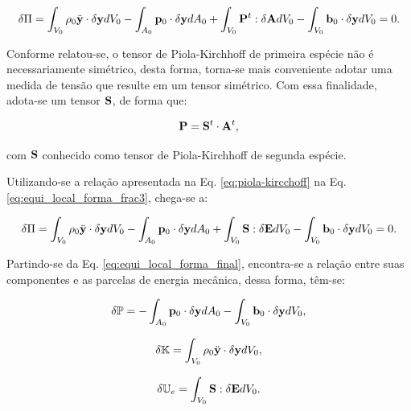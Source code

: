 \documentclass[tese_patricia]{subfiles}
\begin{document}
\begin{align}
\delta\Pi = \int_{V_{0}} \rho_{0} \ddot{\mathbf{y}} \cdot \delta\mathbf{y} dV_{0} - \int_{A_{0}} \mathbf{p}_{0} \cdot \delta\mathbf{y} dA_{0} + \int_{V_{0}} \mathbf{P}^{t} : \delta\mathbf{A} dV_{0} - \int_{V_{0}}  \mathbf{b}_0 \cdot \delta\mathbf{y} dV_{0} = 0. \label{eq:equi_local_forma_frac3}
\end{align}

Conforme relatou-se, o tensor de Piola-Kirchhoff de primeira espécie não é necessariamente simétrico, desta forma, torna-se mais conveniente adotar uma medida de tensão que resulte em um tensor simétrico. Com essa finalidade, adota-se um tensor $\mathbf{S}$, de forma que:

\begin{align}
\mathbf{P} = \mathbf{S}^{t} \cdot \mathbf{A}^{t}, \label{eq:piola-kircchoff}
\end{align}

\noindent com $\mathbf{S}$ conhecido como tensor de Piola-Kirchhoff de segunda espécie. 

Utilizando-se a relação apresentada na Eq. \ref{eq:piola-kircchoff} na Eq. \ref{eq:equi_local_forma_frac3}, chega-se a:

\begin{align}
\delta\Pi = \int_{V_{0}} \rho_{0} \ddot{\mathbf{y}} \cdot \delta\mathbf{y} dV_{0} - \int_{A_{0}} \mathbf{p}_{0} \cdot \delta\mathbf{y} dA_{0} +  \int_{V_{0}} \mathbf{S} : \delta\mathbf{E} dV_{0} - \int_{V_{0}}  \mathbf{b}_0 \cdot \delta\mathbf{y} dV_{0} = 0.
\label{eq:equi_local_forma_final}
\end{align}

Partindo-se da Eq. \ref{eq:equi_local_forma_final}, encontra-se a relação entre suas componentes e as parcelas de energia mecânica, dessa forma, têm-se:

\begin{align}
	 \delta\mathbb{P} = - \int_{A_{0}} \mathbf{p}_{0} \cdot \delta\mathbf{y} dA_{0} - \int_{V_{0}}  \mathbf{b}_0 \cdot \delta\mathbf{y} dV_{0},
\end{align}


\begin{align}
	\delta\mathbb{K} = \int_{V_{0}} \rho_{0} \ddot{\mathbf{y}} \cdot \delta\mathbf{y} dV_{0},
\end{align}

\begin{align}
	 \delta\mathbb{U}_e = \int_{V_{0}} \mathbf{S} : \delta\mathbf{E} dV_{0}.
\end{align}
\end{document}
